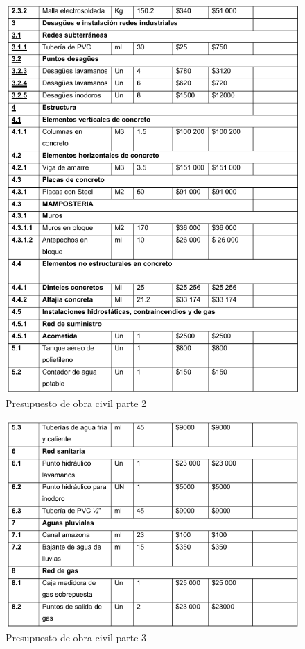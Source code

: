 \begin{figure}[H]
    \centering	
    \includegraphics[width=1.0\textwidth]{chapters/ELC2.png} 
    \caption{Presupuesto de obra civil parte 2}
\label{fig:croquis190125}
\end{figure}

\begin{figure}[H]
    \centering	
    \includegraphics[width=1.0\textwidth]{chapters/ELC3.png} 
    \caption{Presupuesto de obra civil parte 3}
\label{fig:croquis190125}
\end{figure}


